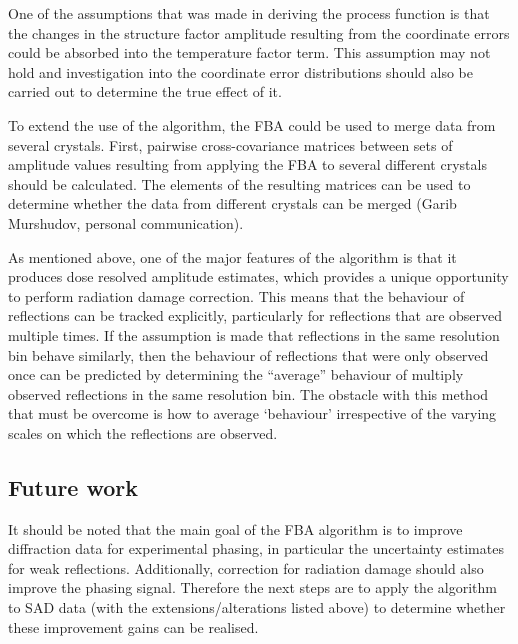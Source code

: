 One of the assumptions that was made in deriving the process function is that the changes in the structure factor amplitude resulting from the coordinate errors could be absorbed into the temperature factor term.
This assumption may not hold and investigation into the coordinate error distributions should also be carried out to determine the true effect of it.

To extend the use of the algorithm, the FBA could be used to merge data from several crystals.
First, pairwise cross-covariance matrices between sets of amplitude values resulting from applying the FBA to several different crystals should be calculated.
The elements of the resulting matrices can be used to determine whether the data from different crystals can be merged (Garib Murshudov, personal communication).

As mentioned above, one of the major features of the algorithm is that it produces dose resolved amplitude estimates, which provides a unique opportunity to perform radiation damage correction.
This means that the behaviour of reflections can be tracked explicitly, particularly for reflections that are observed multiple times.
If the assumption is made that reflections in the same resolution bin behave similarly, then the behaviour of reflections that were only observed once can be predicted by determining the ``average'' behaviour of multiply observed reflections in the same resolution bin.
The obstacle with this method that must be overcome is how to average `behaviour' irrespective of the varying scales on which the reflections are observed.

\subsection{Future work}
\label{sub:Future work}
It should be noted that the main goal of the FBA algorithm is to improve diffraction data for experimental phasing, in particular the uncertainty estimates for weak reflections.
Additionally, correction for radiation damage should also improve the phasing signal.
Therefore the next steps are to apply the algorithm to SAD data (with the extensions/alterations listed above) to determine whether these improvement gains can be realised.
